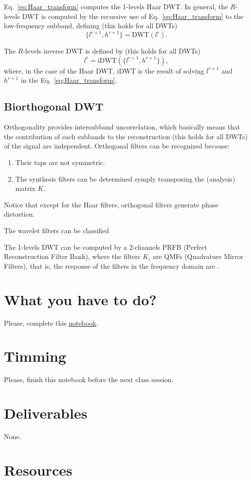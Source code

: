 Eq.~\ref{eq:Haar_transform} computes the 1-levels Haar DWT. In
general, the $R$-levels DWT is computed by the recursive use of
Eq.~\ref{eq:Haar_transform} to the low-frequency subband, defining
(this holds for all DWTs)
\begin{equation}
  \{l^{r+1}, h^{r+1}\} = \text{DWT}(l^r).
\end{equation}

The $R$-levels inverse DWT is defined by (this holds for all DWTs)
\begin{equation}
  l^r = \text{iDWT}(\{l^{r+1}, h^{r+1}\}),
\end{equation}
where, in the case of the Haar DWT, iDWT is the result of solving
$l^{r+1}$ and $h^{r+1}$ in the Eq.~\ref{eq:Haar_transform}.

\subsection{Biorthogonal DWT}
Orthogonality provides intersubband uncorrelation, which basically
means that the contribution of each subbands to the reconstruction
(this holds for all DWTs) of the signal are independent. Orthogonal
filters can be recognized because:
\begin{enumerate}
\item Their taps are not symmetric.
\item The synthesis filters can be determined symply transposing the
  (analysis) matrix $K$.
\end{enumerate}
Notice that except for the Haar filters, orthogonal filters generate
phase distortion.

The wavelet filters can be classified


The 1-levels DWT can be computed by a 2-channels PRFB (Perfect
Reconstruction Filter Bank), where the filters $K_i$ are QMFs
(Quadrature Mirror Filters), that is, the response of the filters in the frequency domain are .

\section{What you have to do?}
  
Please, complete this
\href{https://github.com/Sistemas-Multimedia/Sistemas-Multimedia.github.io/blob/master/study_guide/MDWT/MDWT.ipynb}{notebook}.

\section{Timming}

Please, finish this notebook before the next class session.

\section{Deliverables}

None.

\section{Resources}


